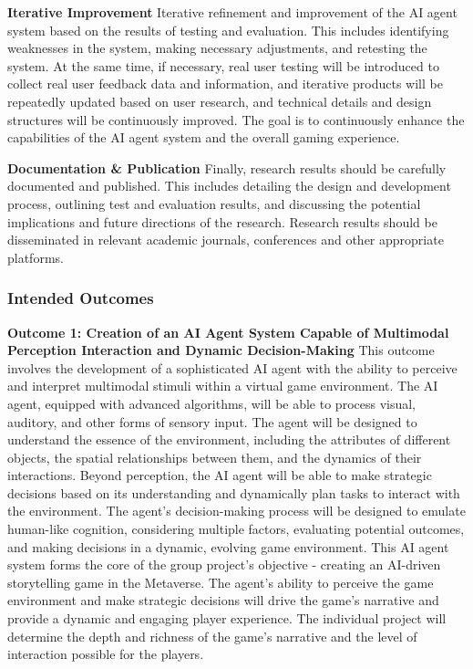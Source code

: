 \textbf{Iterative Improvement}\quad
Iterative refinement and improvement of the AI agent system based on the results of testing and evaluation. 
This includes identifying weaknesses in the system, making necessary adjustments, and retesting the system. 
At the same time, if necessary, real user testing will be introduced to collect real user feedback data and information, and iterative products will be repeatedly updated based on user research, and technical details and design structures will be continuously improved. 
The goal is to continuously enhance the capabilities of the AI agent system and the overall gaming experience.

\textbf{Documentation \& Publication}\quad
Finally, research results should be carefully documented and published. This includes detailing the design and development process, outlining test and evaluation results, and discussing the potential implications and future directions of the research. 
Research results should be disseminated in relevant academic journals, conferences and other appropriate platforms.


\subsubsection{Intended Outcomes}

\textbf{Outcome 1: Creation of an AI Agent System Capable of Multimodal Perception Interaction and Dynamic Decision-Making}\quad
This outcome involves the development of a sophisticated AI agent with the ability to perceive and interpret multimodal stimuli within a virtual game environment. 
The AI agent, equipped with advanced algorithms, will be able to process visual, auditory, and other forms of sensory input. 
The agent will be designed to understand the essence of the environment, including the attributes of different objects, the spatial relationships between them, and the dynamics of their interactions. 
Beyond perception, the AI agent will be able to make strategic decisions based on its understanding and dynamically plan tasks to interact with the environment. 
The agent's decision-making process will be designed to emulate human-like cognition, considering multiple factors, evaluating potential outcomes, and making decisions in a dynamic, evolving game environment.
This AI agent system forms the core of the group project's objective - creating an AI-driven storytelling game in the Metaverse. The agent's ability to perceive the game environment and make strategic decisions will drive the game's narrative and provide a dynamic and engaging player experience. 
The individual project will determine the depth and richness of the game's narrative and the level of interaction possible for the players.

